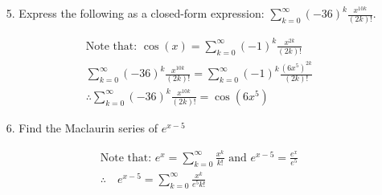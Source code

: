 \begin{itemize}
        \item [5.] Express the following as a closed-form expression: $\sum\limits_{k=0}^{\infty}(-36)^{k}\frac{x^{10k}}{(2k)!}$.
        \\
        \begin{mdframed}
            \begin{equation*}
                \begin{gathered}
                    \text{Note that: } \cos(x) = \sum_{k=0}^{\infty}(-1)^{k}\frac{x^{2k}}{(2k)!}    \\
                    \sum_{k=0}^{\infty}(-36)^{k}\frac{x^{10k}}{(2k)!} =
                    \sum_{k=0}^{\infty}(-1)^{k}\frac{(6x^{5})^{2k}}{(2k)!}                   \\
                    \therefore \sum_{k=0}^{\infty}(-36)^{k}\frac{x^{10k}}{(2k)!} =
                    \boxed{\cos(6x^{5})}
                \end{gathered}
            \end{equation*}
        \end{mdframed}

        \item [6.] Find the Maclaurin series of $e^{x-5}$
        \\
        \begin{mdframed}
            \begin{equation*}
                \begin{gathered}
                    \text{Note that: } e^{x} = 
                    \sum_{k=0}^{\infty} \frac{x^{k}}{k!} \text{ and } 
                    e^{x-5} = \frac{e^{x}}{e^{5}}                       \\
                    \therefore \quad e^{x-5} = \boxed{\sum_{k=0}^{\infty}\frac{x^{k}}{e^{5}k!}}
                \end{gathered}
            \end{equation*}
        \end{mdframed}

        \pagebreak


\end{itemize}
